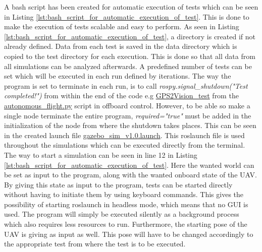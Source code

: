 \documentclass[../Head/report.tex]{subfiles}
\begin{document}
A bash script has been created for automatic execution of tests which can be seen in Listing \ref{lst:bash_script_for_automatic_execution_of_test}. This is done to make the execution of tests scalable and easy to perform. As seen in Listing \ref{lst:bash_script_for_automatic_execution_of_test}, a directory is created if not already defined. Data from each test is saved in the data directory which is copied to the test directory for each execution. This is done so that all data from all simulations can be analyzed afterwards. A predefined number of tests can be set which will be executed in each run defined by iterations. The way the program is set to terminate in each run, is to call \textit{rospy.signal\_shutdown("Test completed!")} from within the end of the code e.g \href{https://github.com/Kenil16/master\_project/blob/0ca6b6205ecfd8cc6a819d7cd30c979fcd39e6e8/software/ros\_workspace/src/offboard\_control/autonomous\_flight.py#L266}{GPS2Vision\_test} from the \href{https://github.com/Kenil16/master\_project/blob/master/software/ros\_workspace/src/offboard\_control/autonomous\_flight.py}{autonomous\_flight.py} script in offboard control. However, to be able so make a single node terminate the entire program, \textit{required="true"} must be added in the initialization of the node from where the shutdown takes places. This can be seen in the created launch file \href{https://github.com/Kenil16/master\_project/blob/0ca6b6205ecfd8cc6a819d7cd30c979fcd39e6e8/software/ros\_workspace/PX4-software/launch/gazebo\_sim\_v1.0.launch#L63}{gazebo\_sim\_v1.0.launch}. This roslaunch file is used throughout the simulations which can be executed directly from the terminal. The way to start a simulation can be seen in line 12 in Listing \ref{lst:bash_script_for_automatic_execution_of_test}. Here the wanted world can be set as input to the program, along with the wanted onboard state of the UAV. By giving this state as input to the program, tests can be started directly without having to initiate them by using keyboard commands. This gives the possibility of starting roslaunch in headless mode, which means that no GUI is used. The program will simply be executed silently as a background process which also requires less resources to run. Furthermore, the starting pose of the UAV is giving as input as well. This pose will have to be changed accordingly to the appropriate test from where the test is to be executed. 
\end{document}
